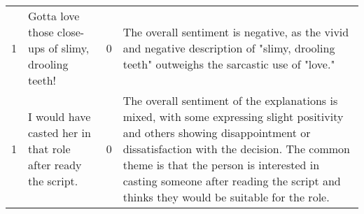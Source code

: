 \begin{tabular}{r{1cm} p{0.4in} r{1cm} p{0.4in}}
1 & Gotta love those close-ups of slimy, drooling teeth! & 0 & The overall sentiment is negative, as the vivid and negative description of "slimy, drooling teeth" outweighs the sarcastic use of "love." \\
1 & I would have casted her in that role after ready the script. & 0 & The overall sentiment of the explanations is mixed, with some expressing slight positivity and others showing disappointment or dissatisfaction with the decision. The common theme is that the person is interested in casting someone after reading the script and thinks they would be suitable for the role. \\
\bottomrule
\end{tabular}
